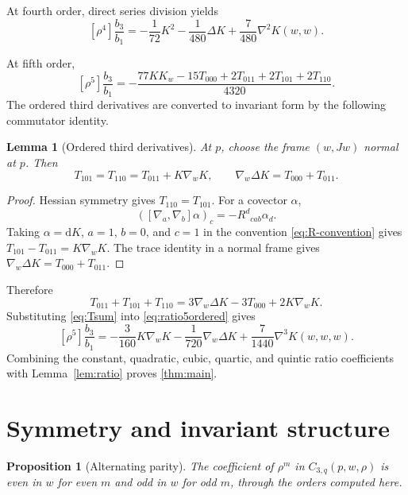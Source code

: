 \documentclass[11pt]{amsart}
\numberwithin{equation}{section}
\newtheorem{proposition}[theorem]{Proposition}
\newtheorem{lemma}[theorem]{Lemma}
\theoremstyle{remark}
\newcommand{\Hess}{\nabla^2}
\newcommand{\Third}{\nabla^3}
\newcommand{\dd}{\mathrm{d}}
\begin{document}
At fourth order, direct series division yields
\begin{equation}\label{eq:ratio4}
\left[\rho^4\right]\frac{b_3}{b_1}
=-\frac1{72}K^2-\frac1{480}\Delta K+\frac7{480}\Hess K(w,w).
\end{equation}

At fifth order,
\begin{equation}\label{eq:ratio5ordered}
\left[\rho^5\right]\frac{b_3}{b_1}
=-\frac{77KK_w-15T_{000}+2T_{011}+2T_{101}+2T_{110}}{4320}.
\end{equation}
The ordered third derivatives are converted to invariant form by the following commutator identity.

\begin{lemma}[Ordered third derivatives]\label{lem:commutator}
At $p$, choose the frame $(w,Jw)$ normal at $p$.  Then
\begin{equation}\label{eq:T-relations}
 T_{101}=T_{110}=T_{011}+K\nabla_wK,
 \qquad
 \nabla_w\Delta K=T_{000}+T_{011}.
\end{equation}
\end{lemma}

\begin{proof}
Hessian symmetry gives $T_{110}=T_{101}$.  For a covector $\alpha$,
\[
 ([\nabla_a,\nabla_b]\alpha)_c=-R^d{}_{cab}\alpha_d.
\]
Taking $\alpha=\dd K$, $a=1$, $b=0$, and $c=1$ in the convention \eqref{eq:R-convention} gives $T_{101}-T_{011}=K\nabla_wK$.  The trace identity in a normal frame gives $\nabla_w\Delta K=T_{000}+T_{011}$.
\end{proof}

Therefore
\begin{equation}\label{eq:Tsum}
 T_{011}+T_{101}+T_{110}
 =3\nabla_w\Delta K-3T_{000}+2K\nabla_wK.
\end{equation}
Substituting \eqref{eq:Tsum} into \eqref{eq:ratio5ordered} gives
\begin{equation}\label{eq:ratio5}
\left[\rho^5\right]\frac{b_3}{b_1}
=-\frac3{160}K\nabla_wK
-\frac1{720}\nabla_w\Delta K
+\frac7{1440}\Third K(w,w,w).
\end{equation}
Combining the constant, quadratic, cubic, quartic, and quintic ratio coefficients with Lemma~\ref{lem:ratio} proves \cref{thm:main}.

\section{Symmetry and invariant structure}\label{sec:symmetry}

\begin{proposition}[Alternating parity]\label{prop:parity}
The coefficient of $\rho^m$ in $C_{3,q}(p,w,\rho)$ is even in $w$ for even $m$ and odd in $w$ for odd $m$, through the orders computed here.
\end{proposition}
\end{document}

